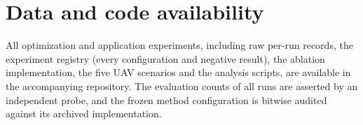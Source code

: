 \documentclass[11pt,a4paper]{article}
\begin{document}
\section*{Data and code availability}
All optimization and application experiments, including raw per-run records,
the experiment registry (every configuration and negative result), the
ablation implementation, the five UAV scenarios and the analysis scripts, are
available in the accompanying repository. The evaluation counts of all runs
are asserted by an independent probe, and the frozen method configuration is
bitwise audited against its archived implementation.



\end{document}
